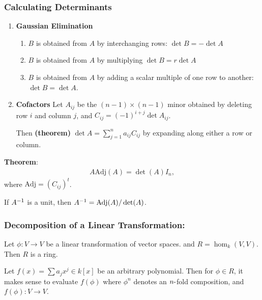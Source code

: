 \hypertarget{calculating-determinants}{%
\subsubsection{Calculating
Determinants}\label{calculating-determinants}}

\begin{enumerate}
\def\labelenumi{\arabic{enumi}.}
\item
  \textbf{Gaussian Elimination}

  \begin{enumerate}
  \def\labelenumii{\alph{enumii}.}
  \item
    \(B\) is obtained from \(A\) by interchanging rows:
    \(\det B = -\det A\)
  \item
    \(B\) is obtained from \(A\) by multiplying \(\det B = r \det A\)
  \item
    \(B\) is obtained from \(A\) by adding a scalar multiple of one row
    to another: \(\det B = \det A\).
  \end{enumerate}
\item
  \textbf{Cofactors} Let \(A_{ij}\) be the \((n-1)\times (n-1)\) minor
  obtained by deleting row \(i\) and column \(j\), and
  \(C_{ij} = (-1)^{i+j} \det A_{ij}\).

  Then \textbf{(theorem)} \(\det A = \sum_{j=1}^n a_{ij} C_{ij}\) by
  expanding along either a row or column.
\end{enumerate}

\textbf{Theorem}:
\begin{align*}
A \mathrm{Adj}(A) = \det (A) I_n
,\end{align*} where \(\mathrm{Adj} = (C_{ij})^t\).

If \(A^{-1}\) is a unit, then \(A^{-1} = \mathrm{Adj}(A) / \det(A)\).

\hypertarget{decomposition-of-a-linear-transformation}{%
\subsubsection{Decomposition of a Linear
Transformation:}\label{decomposition-of-a-linear-transformation}}

Let \(\phi: V \to V\) be a linear transformation of vector spaces. and
\(R = \hom_k(V, V)\). Then \(R\) is a ring.

Let \(f(x) = \sum a_j x^j \in k[x]\) be an arbitrary polynomial. Then
for \(\phi \in R\), it makes sense to evaluate \(f(\phi)\) where
\(\phi^n\) denotes an \(n{\hbox{-}}\)fold composition, and
\(f(\phi): V \to V\).

